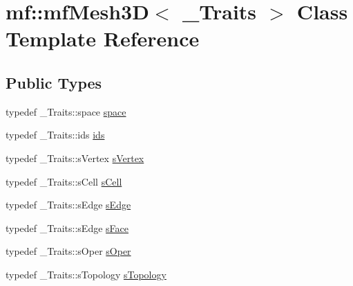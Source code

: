 \hypertarget{classmf_1_1mfMesh3D}{
\section{mf::mfMesh3D$<$ \_\-Traits $>$ Class Template Reference}
\label{classmf_1_1mfMesh3D}
}
\subsection*{Public Types}
\begin{DoxyCompactItemize}
\item 
typedef \_\-Traits::space \hyperlink{classmf_1_1mfMesh3D_aea7155b49fb50982a399056973e6b4d8}{space}
\item 
typedef \_\-Traits::ids \hyperlink{classmf_1_1mfMesh3D_aeae559d0564bf64617c8fd83ba264895}{ids}
\item 
typedef \_\-Traits::sVertex \hyperlink{classmf_1_1mfMesh3D_ac523ee47bc707949d351f9f73d09677e}{sVertex}
\item 
typedef \_\-Traits::sCell \hyperlink{classmf_1_1mfMesh3D_acbb717ca80998e53d622ab2ae35b9134}{sCell}
\item 
typedef \_\-Traits::sEdge \hyperlink{classmf_1_1mfMesh3D_a93992ed7712bd9dbcc0430166a540d1c}{sEdge}
\item 
typedef \_\-Traits::sEdge \hyperlink{classmf_1_1mfMesh3D_ae70500195d62c66dc79d18394652a2af}{sFace}
\item 
typedef \_\-Traits::sOper \hyperlink{classmf_1_1mfMesh3D_ab30b285a3a7387627cf13798561050a0}{sOper}
\item 
typedef \_\-Traits::sTopology \hyperlink{classmf_1_1mfMesh3D_af51322fa414c9ddd714ef2088651a794}{sTopology}
\end{DoxyCompactItemize}
